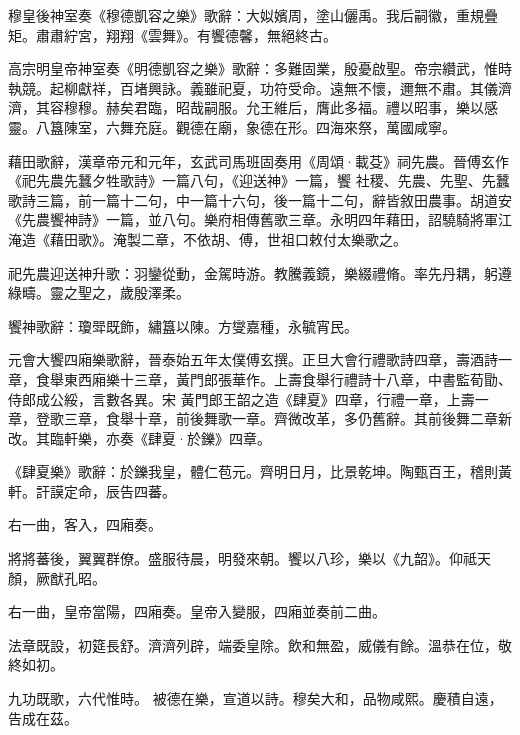 \begin{pinyinscope}
 穆皇後神室奏《穆德凱容之樂》歌辭：大姒嬪周，塗山儷禹。我后嗣徽，重規疊矩。肅肅紵宮，翔翔《雲舞》。有饗德馨，無絕終古。



 高宗明皇帝神室奏《明德凱容之樂》歌辭：多難固業，殷憂啟聖。帝宗纘武，惟時執競。起柳獻祥，百堵興詠。義雖祀夏，功符受命。遠無不懷，邇無不肅。其儀濟濟，其容穆穆。赫矣君臨，昭哉嗣服。允王維后，膺此多福。禮以昭事，樂以感靈。八簋陳室，六舞充庭。觀德在廟，象德在形。四海來祭，萬國咸寧。



 藉田歌辭，漢章帝元和元年，玄武司馬班固奏用《周頌·載芟》祠先農。晉傅玄作《祀先農先蠶夕牲歌詩》一篇八句，《迎送神》一篇，饗
 社稷、先農、先聖、先蠶歌詩三篇，前一篇十二句，中一篇十六句，後一篇十二句，辭皆敘田農事。胡道安《先農饗神詩》一篇，並八句。樂府相傳舊歌三章。永明四年藉田，詔驍騎將軍江淹造《藉田歌》。淹製二章，不依胡、傅，世祖口敕付太樂歌之。



 祀先農迎送神升歌：羽鑾從動，金駕時游。教騰義鏡，樂綴禮脩。率先丹耦，躬遵綠疇。靈之聖之，歲殷澤柔。



 饗神歌辭：瓊斝既飾，繡簋以陳。方燮嘉種，永毓宵民。



 元會大饗四廂樂歌辭，晉泰始五年太僕傅玄撰。正旦大會行禮歌詩四章，壽酒詩一章，食舉東西廂樂十三章，黃門郎張華作。上壽食舉行禮詩十八章，中書監荀勖、侍郎成公綏，言數各異。宋
 黃門郎王韶之造《肆夏》四章，行禮一章，上壽一章，登歌三章，食舉十章，前後舞歌一章。齊微改革，多仍舊辭。其前後舞二章新改。其臨軒樂，亦奏《肆夏·於鑠》四章。



 《肆夏樂》歌辭：於鑠我皇，體仁苞元。齊明日月，比景乾坤。陶甄百王，稽則黃軒。訐謨定命，辰告四蕃。



 右一曲，客入，四廂奏。



 將將蕃後，翼翼群僚。盛服待晨，明發來朝。饗以八珍，樂以《九韶》。仰祗天顏，厥猷孔昭。



 右一曲，皇帝當陽，四廂奏。皇帝入變服，四廂並奏前二曲。



 法章既設，初筵長舒。濟濟列辟，端委皇除。飲和無盈，威儀有餘。溫恭在位，敬終如初。



 九功既歌，六代惟時。
 被德在樂，宣道以詩。穆矣大和，品物咸熙。慶積自遠，告成在茲。




\end{pinyinscope}
